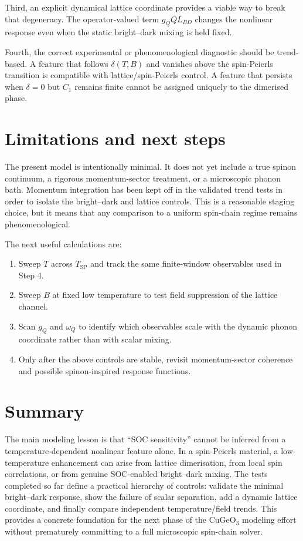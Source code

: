 \documentclass[10pt,twocolumn]{article}
\begin{document}
Third, an explicit dynamical lattice coordinate provides a viable way to break
that degeneracy.  The operator-valued term $g_QQL_{BD}$ changes the nonlinear
response even when the static bright--dark mixing is held fixed.

Fourth, the correct experimental or phenomenological diagnostic should be
trend-based.  A feature that follows $\delta(T,B)$ and vanishes above the
spin-Peierls transition is compatible with lattice/spin-Peierls control.  A
feature that persists when $\delta=0$ but $C_1$ remains finite cannot be
assigned uniquely to the dimerised phase.

\section{Limitations and next steps}

The present model is intentionally minimal.  It does not yet include a true
spinon continuum, a rigorous momentum-sector treatment, or a microscopic
phonon bath.  Momentum integration has been kept off in the validated trend
tests in order to isolate the bright--dark and lattice controls.  This is a
reasonable staging choice, but it means that any comparison to a uniform
spin-chain regime remains phenomenological.

The next useful calculations are:
\begin{enumerate}
\item Sweep $T$ across $T_{\mathrm{SP}}$ and track the same finite-window
observables used in Step 4.
\item Sweep $B$ at fixed low temperature to test field suppression of the
lattice channel.
\item Scan $g_Q$ and $\omega_Q$ to identify which observables scale with the
dynamic phonon coordinate rather than with scalar mixing.
\item Only after the above controls are stable, revisit momentum-sector
coherence and possible spinon-inspired response functions.
\end{enumerate}

\section{Summary}

The main modeling lesson is that ``SOC sensitivity'' cannot be inferred from a
temperature-dependent nonlinear feature alone.  In a spin-Peierls material, a
low-temperature enhancement can arise from lattice dimerisation, from local
spin correlations, or from genuine SOC-enabled bright--dark mixing.  The tests
completed so far define a practical hierarchy of controls: validate the minimal
bright--dark response, show the failure of scalar separation, add a dynamic
lattice coordinate, and finally compare independent temperature/field trends.
This provides a concrete foundation for the next phase of the CuGeO$_3$
modeling effort without prematurely committing to a full microscopic spin-chain
solver.
\end{document}
